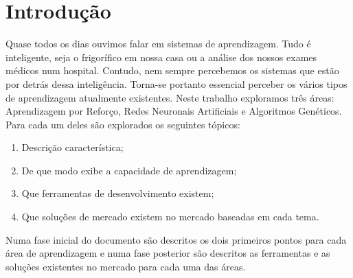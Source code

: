 \section{Introdução}\label{sec:Introduction}

Quase todos os dias ouvimos falar em sistemas de aprendizagem. Tudo é inteligente, seja o frigorífico em nossa casa ou a análise dos nossos exames médicos num hospital. Contudo, nem sempre percebemos os sistemas que estão por detrás dessa inteligência. Torna-se portanto essencial perceber os vários tipos de aprendizagem atualmente existentes. 
Neste trabalho exploramos três áreas: Aprendizagem por Reforço, Redes Neuronais Artificiais e Algoritmos Genéticos.
Para cada um deles são explorados os seguintes tópicos:

\begin{enumerate}
\item Descrição característica;
\item De que modo exibe a capacidade de aprendizagem;
\item Que ferramentas de desenvolvimento existem;
\item Que soluções de mercado existem no mercado baseadas em cada tema.
\end{enumerate}

Numa fase inicial do documento são descritos os dois primeiros pontos para cada área de aprendizagem e numa fase posterior são descritos as ferramentas e as soluções existentes no mercado para cada uma das áreas.